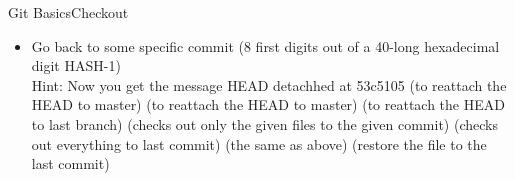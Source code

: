 \begin{frame}{Git Basics}{Checkout}
\begin{itemize}
\item Go back to some specific commit
 (8 first digits out of a 40-long hexadecimal digit HASH-1)
    \hspace{0.2cm} \\Hint: Now you get the message {\color{red} HEAD detachhed at 53c5105}
    \hspace{0.2cm}   (to reattach the HEAD to master)
    \hspace{0.2cm}   (to reattach the HEAD to master)
    \hspace{0.2cm}   (to reattach the HEAD to last branch)
   (checks out only the given files to the given commit)
   (checks out everything to last commit)
   (the same as above)
   (restore the file to the last commit)
\end{itemize}
\end{frame}
